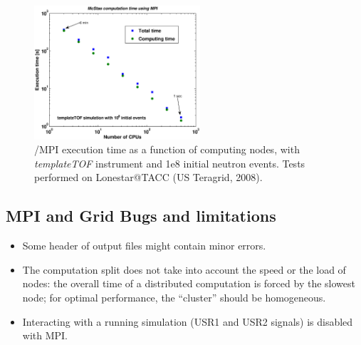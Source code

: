 \begin{figure}[htb!]
  \begin{center}
    \includegraphics[width=0.55\textwidth]{figures/mpi_efficiency.eps}
  \end{center}
\caption{\MCX /MPI execution time as a function of computing nodes, with \textit{templateTOF} instrument and 1e8 initial neutron events. Tests performed on Lonestar@TACC (US Teragrid, 2008).}
\label{fig:mpi_efficiency}
\end{figure}

\subsection{MPI and Grid Bugs and limitations}

\begin{itemize}
\item Some header of output files might contain minor errors.
\item The computation split does not take into account the speed or the
  load of nodes: the overall time of a distributed computation is
  forced by the slowest node; for optimal performance, the ``cluster''
  should be homogeneous.
\item Interacting with a running simulation (USR1 and USR2 signals) is disabled 
  with MPI.
\end{itemize}

